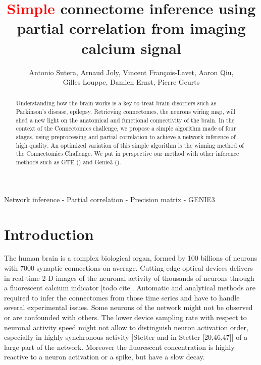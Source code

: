\documentclass[wcp]{jmlr}
\title{\textcolor{red}{Simple} connectome inference using partial correlation from imaging calcium signal}
\author{Antonio Sutera,
        Arnaud Joly,
        Vincent François-Lavet,
        Aaron Qiu, \\
        Gilles Louppe,
        Damien Ernst,
        Pierre Geurts}
\begin{document}
\maketitle


\begin{abstract}
Understanding how the brain works is a key
to treat brain disorders such as Parkinson's disease,
epilepsy. Retrieving connectomes, the neurons wiring map, will shed a new
light on the anatomical and functional connectivity of the brain. In the
context of the Connectomics challenge, we propose a simple algorithm made of
four stages, using preprocessing and partial correlation to achieve a network
inference of high quality. An optimized variation of this simple algorithm
is the winning method of the Connectomics Challenge.
We put in perspective our method
with other inference methods such as GTE (\cite{stetter2012model}) and Genie3
(\cite{huynhthu2010inferring}).


\end{abstract}

\begin{keywords}
Network inference - Partial correlation - Precision matrix - GENIE3
\end{keywords}


\section{Introduction}\label{sec:intro}

The human brain is a complex biological organ, formed by 100
billions of neurons with 7000 synaptic connections on average.
Cutting edge optical devices delivers in real-time  2-D  images of
the neuronal activity of thousands of neurons through a fluorescent
calcium indicator [todo cite]. Automatic and analytical methods are required to infer
the connectomes from those time series and have to handle several
experimental issues. Some neurons of the network might not be
observed or are confounded with others. The lower device sampling rate with
respect to neuronal activity speed might not allow to distinguish neuron
activation order, especially in highly synchronous activity
[Stetter and in Stetter [20,46,47]] of a large part of the network. Moreover
the fluorescent concentration is highly reactive to a neuron activation or a
spike, but have a slow decay.
\end{document}
